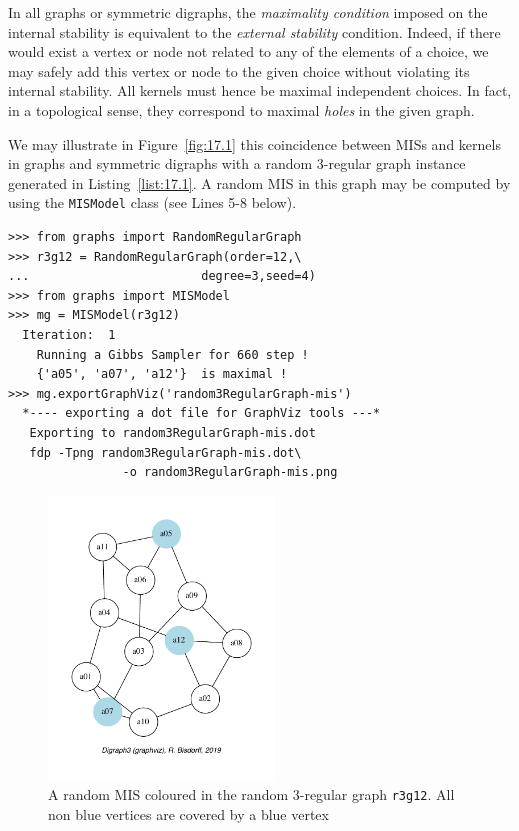 In all graphs or symmetric digraphs, the \emph{maximality condition} imposed on the internal stability is equivalent to the \emph{external stability} condition. Indeed, if there would exist a vertex or node not related to any of the elements of a choice, we may safely add this vertex or node to the given choice without violating its internal stability. All kernels must hence be maximal independent choices. In fact, in a topological sense, they correspond to maximal \emph{holes} in the given graph.

We may illustrate in Figure~\vref{fig:17.1} this coincidence between MISs and kernels in graphs and symmetric digraphs with a random 3-regular graph instance generated in Listing~\vref{list:17.1}. A random MIS in this graph may be computed by using the \texttt{MISModel} class (see Lines 5-8 below).
\begin{lstlisting}[caption={Generating a random 3-regular graph of order 12},label=list:17.1]
>>> from graphs import RandomRegularGraph
>>> r3g12 = RandomRegularGraph(order=12,\
...                        degree=3,seed=4)
>>> from graphs import MISModel
>>> mg = MISModel(r3g12)
  Iteration:  1
    Running a Gibbs Sampler for 660 step !
    {'a05', 'a07', 'a12'}  is maximal !
>>> mg.exportGraphViz('random3RegularGraph-mis')
  *---- exporting a dot file for GraphViz tools ---*
   Exporting to random3RegularGraph-mis.dot
   fdp -Tpng random3RegularGraph-mis.dot\
                -o random3RegularGraph-mis.png
\end{lstlisting}
\begin{figure}[ht]
\sidecaption[t]
\includegraphics[width=6cm]{Figures/17-1-random3RegularGraph-mis.pdf}
\caption[Coloured MIS in a 3-regular graph]{A random MIS coloured in the random 3-regular graph \texttt{r3g12}. All non blue vertices are covered by a blue vertex}
\label{fig:17.1}       %
\end{figure}

